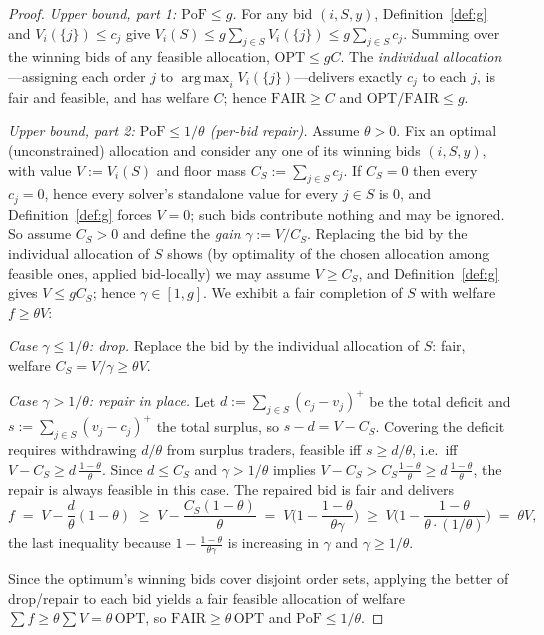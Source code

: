\documentclass[11pt]{article}
\theoremstyle{remark}
\newcommand{\OPT}{\mathrm{OPT}}
\newcommand{\FAIR}{\mathrm{FAIR}}
\newcommand{\PoF}{\mathrm{PoF}}
\DeclareMathOperator*{\argmax}{arg\,max}
\begin{document}
\begin{proof}
\emph{Upper bound, part 1: $\PoF\le g$.}
For any bid $(i,S,y)$, Definition~\ref{def:g} and $V_i(\{j\})\le c_j$ give
$V_i(S)\le g\sum_{j\in S}V_i(\{j\})\le g\sum_{j\in S}c_j$. Summing over the
winning bids of any feasible allocation, $\OPT\le gC$. The \emph{individual
allocation}---assigning each order $j$ to $\argmax_i V_i(\{j\})$---delivers
exactly $c_j$ to each $j$, is fair and feasible, and has welfare $C$; hence
$\FAIR\ge C$ and $\OPT/\FAIR\le g$.

\emph{Upper bound, part 2: $\PoF\le 1/\theta$ (per-bid repair).}
Assume $\theta>0$. Fix an optimal (unconstrained) allocation and consider
any one of its winning bids $(i,S,y)$, with value $V:=V_i(S)$ and floor mass
$C_S:=\sum_{j\in S}c_j$. If $C_S=0$ then every $c_j=0$, hence every solver's
standalone value for every $j\in S$ is $0$, and Definition~\ref{def:g}
forces $V=0$; such bids contribute nothing and may be ignored. So assume
$C_S>0$ and define the \emph{gain} $\gamma:=V/C_S$. Replacing the bid
by the individual allocation of $S$ shows (by optimality of the chosen
allocation among feasible ones, applied bid-locally) we may assume
$V\ge C_S$, and Definition~\ref{def:g} gives $V\le gC_S$; hence
$\gamma\in[1,g]$. We exhibit a fair completion of $S$ with welfare
$f\ge\theta V$:

\emph{Case $\gamma\le 1/\theta$: drop.} Replace the bid by the individual
allocation of $S$: fair, welfare $C_S=V/\gamma\ge\theta V$.

\emph{Case $\gamma>1/\theta$: repair in place.} Let
$d:=\sum_{j\in S}(c_j-v_j)^+$ be the total deficit and
$s:=\sum_{j\in S}(v_j-c_j)^+$ the total surplus, so $s-d=V-C_S$. Covering
the deficit requires withdrawing $d/\theta$ from surplus traders, feasible
iff $s\ge d/\theta$, i.e.\ iff $V-C_S\ge d\,\frac{1-\theta}{\theta}$. Since
$d\le C_S$ and $\gamma>1/\theta$ implies
$V-C_S>C_S\frac{1-\theta}{\theta}\ge d\,\frac{1-\theta}{\theta}$,
the repair is always feasible in this case. The repaired bid is fair and
delivers
\[
f \;=\; V-\frac{d}{\theta}(1-\theta)
\;\ge\; V-\frac{C_S(1-\theta)}{\theta}
\;=\; V\Big(1-\frac{1-\theta}{\theta\gamma}\Big)
\;\ge\; V\Big(1-\frac{1-\theta}{\theta\cdot(1/\theta)}\Big)
\;=\;\theta V,
\]
the last inequality because $1-\frac{1-\theta}{\theta\gamma}$ is increasing
in $\gamma$ and $\gamma\ge1/\theta$.

Since the optimum's winning bids cover disjoint order sets, applying the
better of drop/repair to each bid yields a fair feasible allocation of
welfare $\sum f\ge\theta\sum V=\theta\,\OPT$, so $\FAIR\ge\theta\,\OPT$ and
$\PoF\le1/\theta$.


\end{proof}
\end{document}
